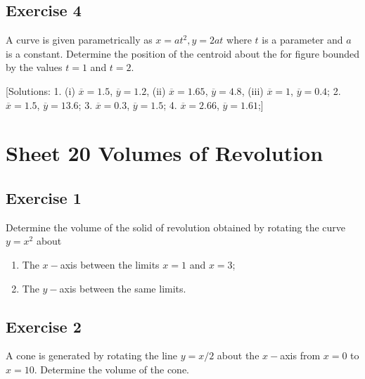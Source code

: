\documentclass[
  11pt,
  oneside]{book}
\providecommand{\tightlist}{%
  \setlength{\itemsep}{0pt}\setlength{\parskip}{0pt}}
\newcommand{\slide}{}
\theoremstyle{definition}
\theoremstyle{definition}
\theoremstyle{definition}
\theoremstyle{definition}
\theoremstyle{remark}
\begin{document}
\slide

\subsection*{Exercise 4}\label{exercise-4-6}

A curve is given parametrically as \(x = at^2, y = 2at\) where \(t\) is a parameter and \(a\) is a constant. Determine the position of the centroid about the for figure bounded by the values \(t = 1\) and \(t = 2\).

{[}Solutions:
1.
(i) \(\overline{x}=1.5\), \(\overline{y}=1.2\),
(ii) \(\overline{x}=1.65\), \(\overline{y}=4.8\),
(iii) \(\overline{x}=1\), \(\overline{y}=0.4\);
2. \(\overline{x}=1.5\), \(\overline{y}=13.6\);
3. \(\overline{x}=0.3\), \(\overline{y}=1.5\);
4. \(\overline{x}=2.66\), \(\overline{y}=1.61\);{]}

\slide

\section{Sheet 20 Volumes of Revolution}\label{sheet-20-volumes-of-revolution}

\slide

\subsection*{Exercise 1}\label{exercise-1-11}

Determine the volume of the solid of revolution obtained by rotating the curve \(y = x^2\) about

\begin{enumerate}
\def\labelenumi{\roman{enumi}.}
\tightlist
\item
  The \(x-\)axis between the limits \(x = 1\) and \(x = 3\);
\item
  The \(y-\)axis between the same limits.
\end{enumerate}

\slide

\subsection*{Exercise 2}\label{exercise-2-11}

A cone is generated by rotating the line \(y = x/2\) about the \(x-\)axis from \(x = 0\) to \(x = 10\). Determine the volume of the cone.
\end{document}
